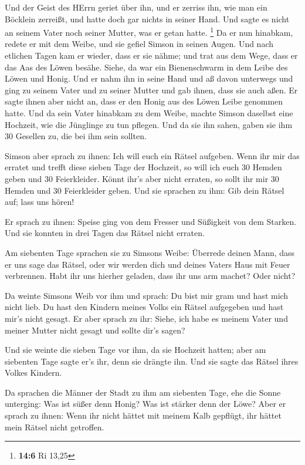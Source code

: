  Und der Geist des HErrn geriet über ihn, und er zerriss
ihn, wie man ein Böcklein zerreißt, und hatte doch gar nichts in seiner
Hand. Und sagte es nicht an seinem Vater noch seiner Mutter, was er
getan hatte. \footnote{\textbf{14:6} Ri 13,25}  Da er nun
hinabkam, redete er mit dem Weibe, und sie gefiel Simson in seinen
Augen.  Und nach etlichen Tagen kam er wieder, dass er sie
nähme; und trat aus dem Wege, dass er das Aas des Löwen besähe. Siehe,
da war ein Bienenschwarm in dem Leibe des Löwen und Honig. 
Und er nahm ihn in seine Hand und aß davon unterwegs und ging zu seinem
Vater und zu seiner Mutter und gab ihnen, dass sie auch aßen. Er sagte
ihnen aber nicht an, dass er den Honig aus des Löwen Leibe genommen
hatte.  Und da sein Vater hinabkam zu dem Weibe, machte
Simson daselbst eine Hochzeit, wie die Jünglinge zu tun pflegen.
 Und da sie ihn sahen, gaben sie ihm 30 Gesellen zu, die
bei ihm sein sollten.

 Simson aber sprach zu ihnen: Ich will euch ein Rätsel
aufgeben. Wenn ihr mir das erratet und trefft diese sieben Tage der
Hochzeit, so will ich euch 30 Hemden geben und 30 Feierkleider.
 Könnt ihr's aber nicht erraten, so sollt ihr mir 30 Hemden
und 30 Feierkleider geben. Und sie sprachen zu ihm: Gib dein Rätsel auf;
lass uns hören!

 Er sprach zu ihnen: Speise ging von dem Fresser und
Süßigkeit von dem Starken. Und sie konnten in drei Tagen das Rätsel
nicht erraten.

 Am siebenten Tage sprachen sie zu Simsons Weibe: Überrede
deinen Mann, dass er uns sage das Rätsel, oder wir werden dich und
deines Vaters Haus mit Feuer verbrennen. Habt ihr uns hierher geladen,
dass ihr uns arm machet? Oder nicht?

 Da weinte Simsons Weib vor ihm und sprach: Du bist mir
gram und hast mich nicht lieb. Du hast den Kindern meines Volks ein
Rätsel aufgegeben und hast mir's nicht gesagt. Er aber sprach zu ihr:
Siehe, ich habe es meinem Vater und meiner Mutter nicht gesagt und
sollte dir's sagen?

 Und sie weinte die sieben Tage vor ihm, da sie Hochzeit
hatten; aber am siebenten Tage sagte er's ihr, denn sie drängte ihn. Und
sie sagte das Rätsel ihres Volkes Kindern.

 Da sprachen die Männer der Stadt zu ihm am siebenten Tage,
ehe die Sonne unterging: Was ist süßer denn Honig? Was ist stärker denn
der Löwe? Aber er sprach zu ihnen: Wenn ihr nicht hättet mit meinem Kalb
gepflügt, ihr hättet mein Rätsel nicht getroffen.

